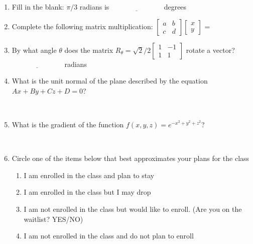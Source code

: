 \documentclass{article}
\begin{document}
\begin{spacing}{1.1}
\begin{enumerate}
\item Fill in the blank: $\pi / 3$ radians is $\underline{\hspace{3cm}}$ degrees \\

\item Complete the following matrix multiplication: $\left[ \begin{array}{cc} a & b \\ c & d \end{array} \right] \left[ \begin{array}{c} x \\ y \end{array} \right]$ = 

\item By what angle $\theta$ does the matrix $R_{\theta} = \sqrt{2}/2 \left[ \begin{array}{cc} 1 & -1 \\ 1 & 1 \end{array} \right]$ rotate a vector? $\underline{\hspace{3cm}}$ radians


\item What is the unit normal of the plane described by the equation $Ax + By + Cz + D = 0$?
\begin{description}
\item[] \leavevmode \\ 
\end{description}

\item What is the gradient of the function $f(x, y, z) = e^{-x^2 + y^2 + z^2}$?
\begin{description}
\item[] \leavevmode \\ 
\end{description}

\item
Circle one of the items below that best approximates your plans for the class

\begin{enumerate}[label=\alph*.]

\item I am enrolled in the class and plan to stay

\item I am enrolled in the class but I may drop

\item I am not enrolled in the class but would like to enroll. (Are you on the waitlist?  YES/NO)

\item I am not enrolled in the class and do not plan to enroll

\end{enumerate}



\end{enumerate}

\end{spacing}
\end{document}
